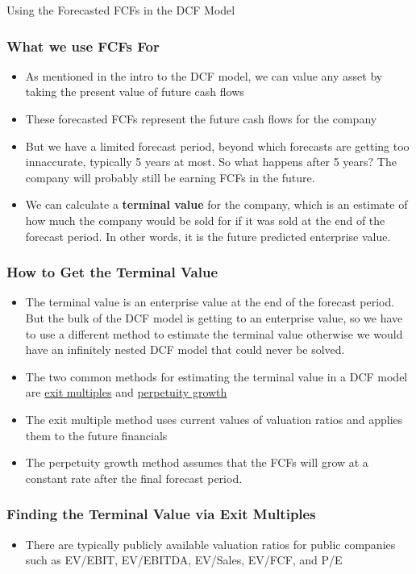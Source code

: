 \documentclass[handout, 11pt]{beamer}
\begin{document}
\begin{section}[Valuation]{Using the Forecasted FCFs in the DCF Model}
\begin{frame}
\frametitle{What we use FCFs For}
\begin{itemize}
\item As mentioned in the intro to the DCF model, we can value any asset by taking the present value of future cash flows
\vfill
\item These forecasted FCFs represent the future cash flows for the company
\vfill
\item But we have a limited forecast period, beyond which forecasts are getting too innaccurate, typically 5 years at most. So what happens after 5 years? The company will probably still be earning FCFs in the future.
\vfill
\item We can calculate a
\textbf{terminal value}
for the company, which is an estimate of how much the company would be sold for if it was sold at the end of the forecast period. In other words, it is the future predicted enterprise value.
\end{itemize}
\end{frame}
\begin{frame}
\frametitle{How to Get the Terminal Value}
\begin{itemize}
\item The terminal value is an enterprise value at the end of the forecast period. But the bulk of the DCF model is getting to an enterprise value, so we have to use a different method to estimate the terminal value otherwise we would have an infinitely nested DCF model that could never be solved.
\vfill
\item The two common methods for estimating the terminal value in a DCF model are
\underline{exit multiples}
and
\underline{perpetuity growth}
\vfill
\item The exit multiple method uses current values of valuation ratios and applies them to the future financials
\vfill
\item The perpetuity growth method assumes that the FCFs will grow at a constant rate after the final forecast period.
\end{itemize}
\end{frame}
\begin{frame}
\frametitle{Finding the Terminal Value via Exit Multiples}
\begin{itemize}
\item There are typically publicly available valuation ratios for public companies such as EV/EBIT, EV/EBITDA, EV/Sales, EV/FCF, and P/E

\end{itemize}
\end{frame}
\end{section}
\end{document}
